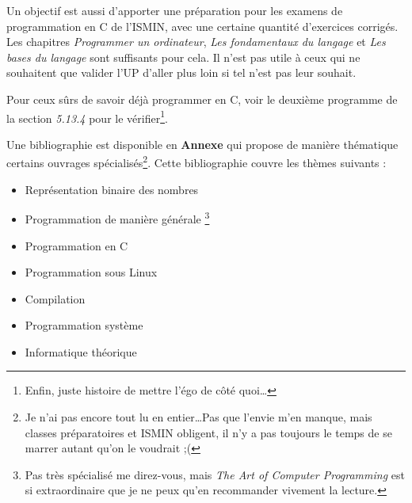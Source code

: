 \documentclass[../main.tex]{subfiles}
\begin{document}
Un objectif est aussi d'apporter une préparation pour les examens de programmation en C de l'ISMIN, avec une certaine quantité d'exercices corrigés. Les chapitres \textit{Programmer un ordinateur}, \textit{Les fondamentaux du langage} et \textit{Les bases du langage} sont suffisants pour cela. Il n'est pas utile à ceux qui ne souhaitent que valider l'UP d'aller plus loin si tel n'est pas leur souhait.

Pour ceux sûrs de savoir déjà programmer en C, voir le deuxième programme de la section \textit{5.13.4} pour le vérifier\footnote{Enfin, juste histoire de mettre l'égo de côté quoi\dots}.


\hrulefill

Une bibliographie est disponible en \textbf{Annexe} qui propose de manière thématique certains ouvrages spécialisés\footnote{Je n'ai pas encore tout lu en entier\dots Pas que l'envie m'en manque, mais classes préparatoires et ISMIN obligent, il n'y a pas toujours le temps de se marrer autant qu'on le voudrait ;(}. Cette bibliographie couvre les thèmes suivants :
\begin{itemize}
	\item Représentation binaire des nombres \cite{MullerEtAl2018}\cite{BitHacks}
	\item Programmation de manière générale \cite{TAOCP}\cite{EoP}\footnote{Pas très spécialisé me direz-vous, mais \textit{The Art of Computer Programming} est si extraordinaire que je ne peux qu'en recommander vivement la lecture.}
	\item Programmation en C \cite{KR}\cite{MSRC}\cite{c11}
	\item Programmation sous Linux \cite{LPI}
	\item Compilation \cite{gnumake}\cite{LL}\cite{AL}\cite{Aho}
	\item Programmation système \cite{CSaPP}
	\item Informatique théorique \cite{XFI}
\end{itemize}
\end{document}
